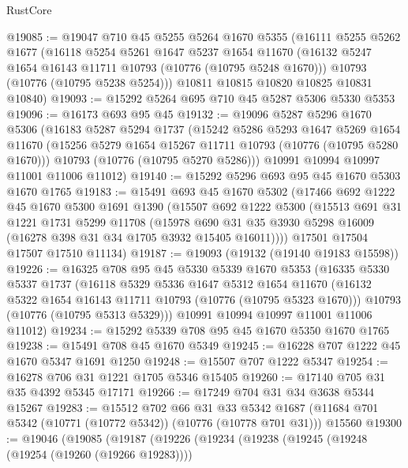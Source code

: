 \begin{lexlean}{RustCore}
\begin{coremodule}
@19085 := @19047
    @710
    @45
    @5255
    @5264
    @1670
    @5355
    (@16111
      @5255
      @5262
      @1677
      (@16118
        @5254
        @5261
        @1647
        @5237
        @1654
        @11670
        (@16132 @5247 @1654 @16143 @11711 @10793 (@10776 (@10795 @5248 @1670)))
        @10793
        (@10776 (@10795 @5238 @5254)))
      @10811
      @10815
      @10820
      @10825
      @10831
      @10840)
@19093 := @15292 @5264 @695 @710 @45 @5287 @5306 @5330 @5353
@19096 := @16173 @693 @95 @45
@19132 := @19096
    @5287
    @5296
    @1670
    @5306
    (@16183
      @5287
      @5294
      @1737
      (@15242
        @5286
        @5293
        @1647
        @5269
        @1654
        @11670
        (@15256 @5279 @1654 @15267 @11711 @10793 (@10776 (@10795 @5280 @1670)))
        @10793
        (@10776 (@10795 @5270 @5286)))
      @10991
      @10994
      @10997
      @11001
      @11006
      @11012)
@19140 := @15292 @5296 @693 @95 @45 @1670 @5303 @1670 @1765
@19183 := @15491
    @693
    @45
    @1670
    @5302
    (@17466
      @692
      @1222
      @45
      @1670
      @5300
      @1691
      @1390
      (@15507
        @692
        @1222
        @5300
        (@15513
          @691
          @31
          @1221
          @1731
          @5299
          @11708
          (@15978 @690 @31 @35 @3930 @5298 @16009 (@16278 @398 @31 @34 @1705 @3932 @15405 @16011))))
      @17501
      @17504
      @17507
      @17510
      @11134)
@19187 := @19093 (@19132 (@19140 @19183 @15598))
@19226 := @16325
    @708
    @95
    @45
    @5330
    @5339
    @1670
    @5353
    (@16335
      @5330
      @5337
      @1737
      (@16118
        @5329
        @5336
        @1647
        @5312
        @1654
        @11670
        (@16132 @5322 @1654 @16143 @11711 @10793 (@10776 (@10795 @5323 @1670)))
        @10793
        (@10776 (@10795 @5313 @5329)))
      @10991
      @10994
      @10997
      @11001
      @11006
      @11012)
@19234 := @15292 @5339 @708 @95 @45 @1670 @5350 @1670 @1765
@19238 := @15491 @708 @45 @1670 @5349
@19245 := @16228 @707 @1222 @45 @1670 @5347 @1691 @1250
@19248 := @15507 @707 @1222 @5347
@19254 := @16278 @706 @31 @1221 @1705 @5346 @15405
@19260 := @17140 @705 @31 @35 @4392 @5345 @17171
@19266 := @17249 @704 @31 @34 @3638 @5344 @15267
@19283 := @15512
    @702
    @66
    @31
    @33
    @5342
    @1687
    (@11684 @701 @5342 (@10771 (@10772 @5342)) (@10776 (@10778 @701 @31)))
    @15560
@19300 := @19046
    (@19085
      (@19187
        (@19226
          (@19234
            (@19238
              (@19245
                (@19248 (@19254 (@19260 (@19266 @19283))))

\end{coremodule}
\end{lexlean}
